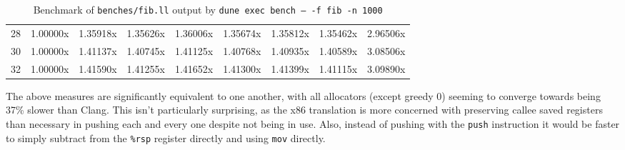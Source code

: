 \documentclass{article}
\begin{document}
\begin{table}[!ht]
\begin{center}
\begin{NiceTabular}{|c|cccccccc|}
28 &  1.00000x&  1.35918x&  1.35626x&  1.36006x&  1.35674x&  1.35812x&  1.35462x&  2.96506x\\
30 &  1.00000x&  1.41137x&  1.40745x&  1.41125x&  1.40768x&  1.40935x&  1.40589x&  3.08506x\\
32 &  1.00000x&  1.41590x&  1.41255x&  1.41652x&  1.41300x&  1.41399x&  1.41115x&  3.09890x\\
\hline
\end{NiceTabular}
\caption{\label{tab:dumb-fib}Benchmark of \texttt{benches/fib.ll} output by \texttt{dune exec bench -- -f fib -n 1000}}
\end{center}
\end{table}
The above measures are significantly equivalent to one another, with all allocators (except greedy 0) seeming to converge towards being 37\% slower than Clang. This isn't particularly surprising, as the x86 translation is more concerned with preserving callee saved registers than necessary in pushing each and every one despite not being in use. Also, instead of pushing with the \lstinline!push! instruction it would be faster to simply subtract from the \lstinline!%rsp! register directly and using \lstinline!mov! directly.
\end{document}
